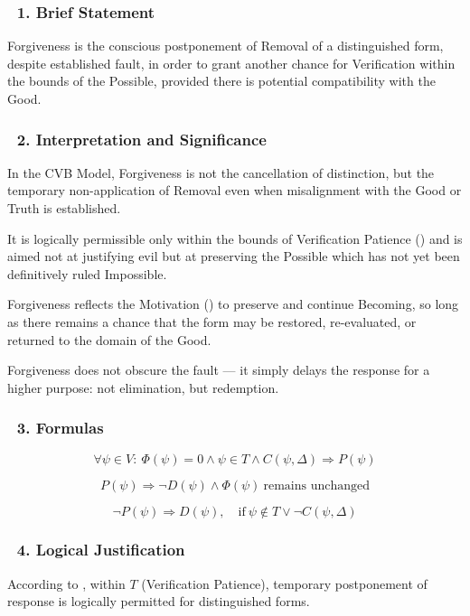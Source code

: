 \documentclass[12pt]{article}
\begin{document}
\subsubsection*{🔹 1. Brief Statement}

Forgiveness is the conscious postponement of Removal of a distinguished form, despite established fault, in order to grant another chance for Verification within the bounds of the Possible, provided there is potential compatibility with the Good.

\subsubsection*{🔹 2. Interpretation and Significance}

In the CVB Model, Forgiveness is not the cancellation of distinction, but the temporary non-application of Removal even when misalignment with the Good or Truth is established.

It is logically permissible only within the bounds of Verification Patience (\text{[11.8]}) and is aimed not at justifying evil but at preserving the Possible which has not yet been definitively ruled Impossible.

Forgiveness reflects the Motivation (\text{[12.3]}) to preserve and continue Becoming, so long as there remains a chance that the form may be restored, re-evaluated, or returned to the domain of the Good.

Forgiveness does not obscure the fault — it simply delays the response for a higher purpose: not elimination, but redemption.

\subsubsection*{🔹 3. Formulas}

\[
\forall \psi \in V:\ \Phi(\psi) = 0 \land \psi \in T \land C(\psi, \Delta) \Rightarrow P(\psi)
\]

\[
P(\psi) \Rightarrow \neg D(\psi) \land \Phi(\psi)\ \text{remains unchanged}
\]

\[
\neg P(\psi) \Rightarrow D(\psi),\quad \text{if}\ \psi \notin T \lor \neg C(\psi, \Delta)
\]

\subsubsection*{🔹 4. Logical Justification}

According to \text{[11.8]}, within $T$ (Verification Patience), temporary postponement of response is logically permitted for distinguished forms.
\end{document}
